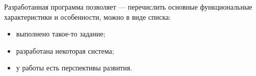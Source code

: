 \documentclass[a4paper,12pt]{article}
\begin{document}
Разработанная программа позволяет --- перечислить основные функциональные характеристики и особенности, можно в виде списка:
\begin{itemize}
\item выполнено такое-то задание;
\item разработана некоторая система;
\item у работы есть перспективы развития.
\end{itemize}

\pagebreak

\printbibliography

\pagebreak
\end{document}

